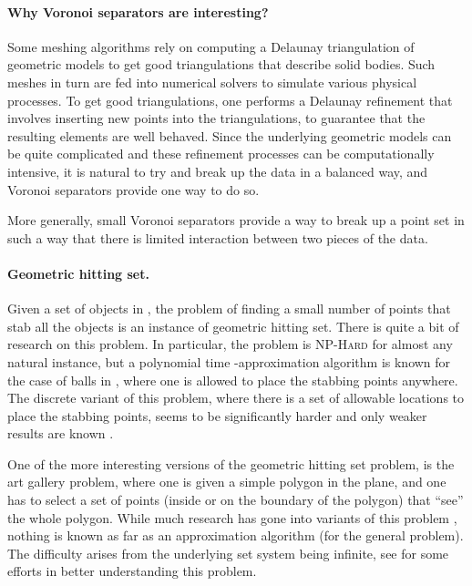 \InSubmitVer{\documentclass[11pt]{article}}
\numberwithin{figure}{section}
\numberwithin{table}{section}
\numberwithin{equation}{section}
\providecommand{\ComplexityClass}[1]{{{\textcolor[named]{OliveGreen}{\textsc{#1}}}}}
\providecommand{\NPHard}{{\ComplexityClass{NP-Hard}}\index{NP!hard}\xspace}
\begin{document}
\paragraph{Why Voronoi separators are interesting?}

Some meshing algorithms rely on computing a Delaunay triangulation of
geometric models to get good triangulations that describe solid
bodies. Such meshes in turn are fed into numerical solvers to simulate
various physical processes. To get good triangulations, one performs a
Delaunay refinement that involves inserting new points into the
triangulations, to guarantee that the resulting elements are well
behaved. Since the underlying geometric models can be quite
complicated and these refinement processes can be computationally
intensive, it is natural to try and break up the data in a balanced
way, and Voronoi separators provide one way to do so.

More generally, small Voronoi separators provide a way to break up a
point set in such a way that there is limited interaction between two
pieces of the data.


\paragraph{Geometric hitting set.}

Given a set of objects in , the problem of finding a small
number of points that stab all the objects is an instance of geometric
hitting set. There is quite a bit of research on this problem. In
particular, the problem is \NPHard for almost any natural instance,
but a polynomial time -approximation algorithm is known for
the case of balls in  \cite{c-ptasp-03}, where one is allowed
to place the stabbing points anywhere. The discrete variant of this
problem, where there is a set of allowable locations to place the
stabbing points, seems to be significantly harder and only weaker
results are known \cite{hl-wgscp-12}.

One of the more interesting versions of the geometric hitting set
problem, is the art gallery problem, where one is given a simple
polygon in the plane, and one has to select a set of points (inside or
on the boundary of the polygon) that ``see'' the whole polygon.  While
much research has gone into variants of this problem \cite{o-agta-87},
nothing is known as far as an approximation algorithm (for the general
problem). The difficulty arises from the underlying set system being
infinite, see \cite{eh-ggt-06} for some efforts in better
understanding this problem.
\end{document}
